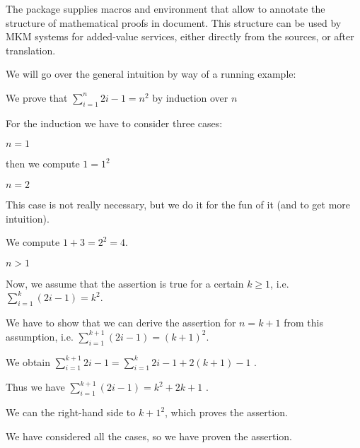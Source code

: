 The  package supplies macros and environment that allow to annotate the
structure of mathematical proofs in \sTeX document. This structure can be used by MKM
systems for added-value services, either directly from the \sTeX sources, or after
translation.

We will go over the general intuition by way of a running example: 

\begin{latexcode}
\begin{sproof}[id=simple-proof]
   {We prove that $\sum_{i=1}^n{2i-1}=n^{2}$ by induction over $n$}
  \begin{spfcases}{For the induction we have to consider three cases:}
   \begin{spfcase}{$n=1$}
    \begin{spfstep}[type=inline] then we compute $1=1^2$\end{spfstep}
   \end{spfcase}
   \begin{spfcase}{$n=2$}
      \begin{spfcomment}[type=inline]
        This case is not really necessary, but we do it for the
        fun of it (and to get more intuition).
      \end{spfcomment}
      \begin{spfstep}[type=inline] We compute $1+3=2^{2}=4$.\end{spfstep}
   \end{spfcase}
   \begin{spfcase}{$n>1$}
      \begin{spfstep}[type=assumption,id=ind-hyp]
        Now, we assume that the assertion is true for a certain $k\geq 1$,
        i.e. $\sum_{i=1}^k{(2i-1)}=k^{2}$.
      \end{spfstep}
      \begin{spfcomment}
        We have to show that we can derive the assertion for $n=k+1$ from
        this assumption, i.e. $\sum_{i=1}^{k+1}{(2i-1)}=(k+1)^{2}$.
      \end{spfcomment}
      \begin{spfstep}
        We obtain $\sum_{i=1}^{k+1}{2i-1}=\sum_{i=1}^k{2i-1}+2(k+1)-1$
        .
      \end{spfstep}
      \begin{spfstep}
        Thus we have $\sum_{i=1}^{k+1}{(2i-1)}=k^2+2k+1$
        .
      \end{spfstep}
      \begin{spfstep}[type=conclusion]
        We can  the right-hand side to
        ${k+1}^2$, which proves the assertion.
      \end{spfstep}
   \end{spfcase}
    \begin{spfstep}[type=conclusion]
      We have considered all the cases, so we have proven the assertion.
    \end{spfstep}
  \end{spfcases}
\end{sproof}
\end{latexcode}

